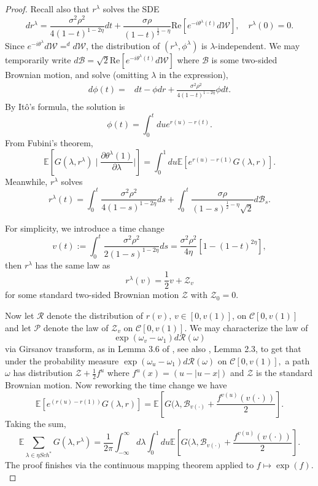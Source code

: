 \documentclass[12pt, reqno]{amsart}
\theoremstyle{definition}
\theoremstyle{remark}
\numberwithin{equation}{section}
\begin{document}
\begin{proof}
Recall also that $r^\lambda$ solves the SDE 
$$
dr^\lambda=\frac{\sigma^2\rho^2}{4(1-t)^{1-2\eta}}dt+\frac{\sigma\rho}{(1-t)^{\frac{1}{2}-\eta}}\text{Re}[e^{-i\theta^\lambda(t)}d\mathcal{W}],\quad r^\lambda(0)=0.$$
Since $e^{-i\theta^\lambda}d\mathcal{W}=^d d\mathcal{W}$, the distribution of $(r^\lambda,\phi^\lambda)$ is $\lambda$-independent. We may temporarily write $d\mathcal{B}=\sqrt{2}\text{Re}[e^{-i\theta^\lambda(t)}d\mathcal{W}]$ where $\mathcal{B}$ is some two-sided Brownian motion, and solve (omitting $\lambda$ in the expression),
$$\begin{aligned}
d\phi(t)=&dt-\phi dr +\frac{\sigma^2\rho^2}{4(1-t)^{1-2\eta}}\phi dt
.\end{aligned}$$
 By Itô's formula, the solution is 
 $$\phi(t)=\int_0^t du e^{r(u)-r(t)}.$$
From Fubini's theorem, 
$$\mathbb{E}\left[G(\lambda,r^\lambda)\mid \frac{\partial\theta^\lambda(1)}{\partial\lambda}|\right]=\int_0^1 du\mathbb{E}[e^{r(u)-r(1)}G(\lambda,r)].$$
Meanwhile, $r^\lambda$ solves
$$r^\lambda(t)=\int_0^t \frac{\sigma^2\rho^2}{4(1-s)^{1-2\eta}}ds +\int_0^t \frac{\sigma\rho}{(1-s)^{\frac{1}{2}-\eta}\sqrt{2}}d\mathcal{B}_s.$$



For simplicity, we introduce a time change \begin{equation}
    \label{timechange}
v(t):=\int_0^t \frac{\sigma^2\rho^2}{2(1-s)^{1-2\eta}}ds=\frac{\sigma^2\rho^2}{4\eta}[1-(1-t)^{2\eta}],\end{equation}
then $r^\lambda$ has the same law as
$$r^\lambda(v)=\frac{1}{2}v+\mathcal{Z}_v$$
for some standard two-sided Brownian motion $\mathcal{Z}$ with $\mathcal{Z}_0=0$.

Now let $\mathcal{R}$ denote the distribution of $r(v)$, $v\in[0,v(1)]$, on $\mathcal{C}[0,v(1)]$ and let $\mathcal{P}$ denote the law of $\mathcal{Z}_v$ on $\mathcal{C}[0,v(1)]$. We may characterize the law of 
$$\exp(\omega_v-\omega_1)d\mathcal{R}(\omega)$$
via Girsanov transform, as in Lemma 3.6 of \cite{rifkind2018eigenvectors}, see also \cite{nakano2022shape}, Lemma 2.3, to get that under the probability measure $\exp(\omega_u-\omega_1)d\mathcal{R}(\omega)$ on $\mathcal{C}[0,v(1)],$ a path $\omega$ has distribution $\mathcal{Z}+\frac{1}{2}f^u$ where $f^u(x)=(u-|u-x|)$ and $\mathcal{Z}$ is the standard Brownian motion. Now reworking the time change we have
$$\mathbb{E}[e^{(r(u)-r(1))}G(\lambda,r)]=\mathbb{E}[G(\lambda,\mathcal{B}_{v(\cdot)}+\frac{f^{v(u)}(v(\cdot))}{2}].$$
Taking the sum, 
$$\mathbb{E}\sum_{\lambda\in \eta Sch^*}G(\lambda,r^\lambda)=\frac{1}{2\pi}\int_{-\infty}^\infty d\lambda \int_0^1 du\mathbb{E}[G(\lambda, \mathcal{B}_{v(\cdot)}+\frac{f^{v(u)}(v(\cdot))}{2}].
$$
The proof finishes via the continuous mapping theorem applied to $f\mapsto \exp (f).$
\end{proof}
\end{document}
